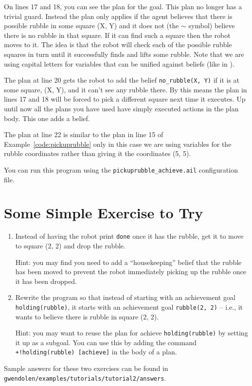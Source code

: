On lines 17 and 18, you can see the plan for the goal.  This plan no longer has a trivial guard.  Instead the plan only applies if the agent believes that there is possible rubble in some square (X, Y) and it does not (the $\sim$ symbol) believe there is no rubble in that square.  If it can find such a square then the robot moves to it.  The idea is that the robot will check each of the possible rubble squares  in turn until it successfully finds and lifts some rubble.  Note that we are using capital letters for variables that can be unified against beliefs (like in \prolog).

The plan at line 20 gets the robot to add the belief \lstinline{no_rubble(X, Y)} if it is at some square, (X, Y), and it can't see any rubble there.  By this means the plan in lines 17 and 18 will be forced to pick a different square next time it executes.  Up until now all the plans you have used have simply executed actions in the plan body.  This one adds a belief.

The plan at line 22 is similar to the plan in line 15 of Example~\ref{code:pickuprubble} only in this case we are using variables for the rubble coordinates rather than giving it the coordinates (5, 5).

You can run this program using the \lstinline{pickuprubble_achieve.ail} configuration file.

\section{Some Simple Exercise to Try}
\begin{enumerate}
\item Instead of having the robot print \lstinline{done} once it has the rubble, get it to move to square (2, 2) and drop the rubble.  

Hint: you may find  you need to add a ``housekeeping'' belief that the rubble has been moved to prevent the robot immediately picking up the rubble once it has been dropped.
\item Rewrite the program so that instead of starting with an achievement goal \lstinline{holding(rubble)}, it starts with an achievement goal \lstinline{rubble(2, 2)} -- i.e., it wants to believe there is rubble in square (2, 2).

Hint: you may want to reuse the plan for achieve \lstinline{holding(rubble)} by setting it up as a subgoal.  You can use this by adding the command \lstinline{+!holding(rubble) [achieve]} in the body of a plan.
\end{enumerate}
\begin{sloppypar}
Sample answers for these two exercises can be found in \texttt{gwendolen/examples/tutorials/tutorial2/answers}.
\end{sloppypar}


